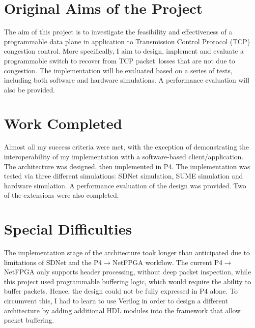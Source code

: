 \section*{Original Aims of the Project}
The aim of this project is to investigate the feasibility and effectiveness of a programmable data plane in application to Transmission Control Protocol (TCP) congestion control. More specifically, I aim to design, implement and evaluate a programmable switch to recover from TCP packet losses that are not due to congestion. The implementation will be evaluated based on a series of tests, including both software and hardware simulations. A performance evaluation will also be provided.  

\section*{Work Completed}
Almost all my success criteria were met, with the exception of demonstrating the interoperability of my implementation with a software-based client/application. The architecture was designed, then implemented in P4. The implementation was tested via three different simulations: SDNet simulation, SUME simulation and hardware simulation. A performance evaluation of the design was provided. Two of the extensions were also completed. 

\section*{Special Difficulties}
The implementation stage of the architecture took longer than anticipated due to limitations of SDNet and the P4$\rightarrow$NetFPGA workflow. The current P4$\rightarrow$NetFPGA only supports header processing, without deep packet inspection, while this project used programmable buffering logic, which would require the ability to buffer packets. Hence, the design could not be fully expressed in P4 alone. To circumvent this, I had to learn to use Verilog in order to design a different architecture by adding additional HDL modules into the framework that allow packet buffering. 